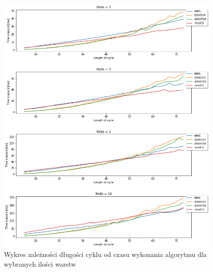 \documentclass[10pt,a4paper]{article}
\begin{document}
	\pagebreak
	
	\vspace*{\fill}
	\begin{figure}[H]
		\begin{center}
			\includegraphics[width=\textwidth]{images/tests/odd_cycles/performance_per_cycle_length.png}
			\caption{Wykres zależności długości cyklu od czasu wykonania algorytmu dla wybranych ilości warstw}
		\end{center}
	\end{figure}
	\vspace*{\fill}
	
	\pagebreak
\end{document}
